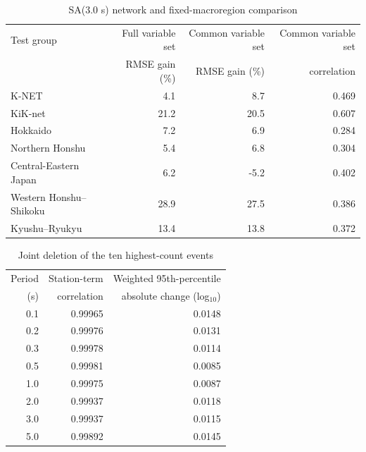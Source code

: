 \documentclass[10pt]{article}
\begin{document}
\begin{table}[H]
\centering
\caption{SA(3.0 s) network and fixed-macroregion comparison}
\small
\begin{tabular}{lrrr}
\toprule
Test group & Full variable set & Common variable set & Common variable set \\
& RMSE gain (\%) & RMSE gain (\%) & correlation \\
\midrule
K-NET & 4.1 & 8.7 & 0.469 \\
KiK-net & 21.2 & 20.5 & 0.607 \\
Hokkaido & 7.2 & 6.9 & 0.284 \\
Northern Honshu & 5.4 & 6.8 & 0.304 \\
Central-Eastern Japan & 6.2 & -5.2 & 0.402 \\
Western Honshu--Shikoku & 28.9 & 27.5 & 0.386 \\
Kyushu--Ryukyu & 13.4 & 13.8 & 0.372 \\
\bottomrule
\end{tabular}
\end{table}

\begin{table}[H]
\centering
\caption{Joint deletion of the ten highest-count events}
\small
\begin{tabular}{rrr}
\toprule
Period & Station-term & Weighted 95th-percentile \\
(s) & correlation & absolute change (log$_{10}$) \\
\midrule
0.1 & 0.99965 & 0.0148 \\
0.2 & 0.99976 & 0.0131 \\
0.3 & 0.99978 & 0.0114 \\
0.5 & 0.99981 & 0.0085 \\
1.0 & 0.99975 & 0.0087 \\
2.0 & 0.99937 & 0.0118 \\
3.0 & 0.99937 & 0.0115 \\
5.0 & 0.99892 & 0.0145 \\
\bottomrule
\end{tabular}
\end{table}
\end{document}
